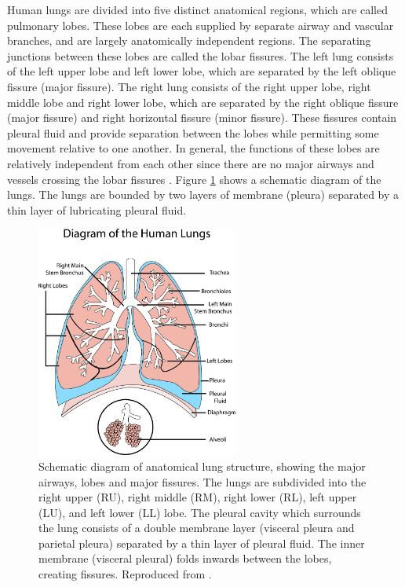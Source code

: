 Human lungs are divided into five distinct anatomical regions, which are called pulmonary lobes. These lobes are each supplied by separate airway and vascular branches, and are largely anatomically independent regions. The separating junctions between these lobes are called the lobar fissures. The left lung consists of the left upper lobe and left lower lobe, which are separated by the left oblique fissure (major fissure). The right lung consists of the right upper lobe, right middle lobe and right lower lobe, which are separated by the right oblique fissure (major fissure) and right horizontal fissure (minor fissure). These fissures contain pleural fluid and provide separation between the lobes while permitting some movement relative to one another. In general, the functions of these lobes are relatively independent from each other since there are no major airways and vessels crossing the lobar fissures \citep{lassen2010automatic,doel2015review,ukil2009anatomy}. Figure \ref{fig:LobeAnatomicalStructure} shows a schematic diagram of the lungs. The lungs are bounded by two layers of membrane (pleura) separated by a thin layer of lubricating pleural fluid. 

\begin{figure}[h!]
  \centering 
  \includegraphics[height=3.0in]{Segmentation/Image/LobeAnatomicalStructure.jpg}
  \caption{Schematic diagram of anatomical lung structure, showing the major airways, lobes and major fissures. The lungs are subdivided into the right upper (RU), right middle (RM), right lower (RL), left upper (LU), and left lower (LL) lobe. The pleural cavity which surrounds the lung consists of a double membrane layer (visceral pleura and parietal pleura) separated by a thin layer of pleural fluid. The inner membrane (visceral pleural) folds inwards between the lobes, creating fissures. Reproduced from \citep{doel2015review}.}
  \label{fig:LobeAnatomicalStructure}
\end{figure}

